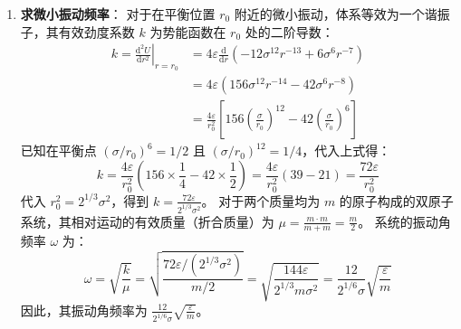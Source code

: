 \begin{solution}
\begin{enumerate}
    \item[(b)] \textbf{求微小振动频率}：
    对于在平衡位置 $r_0$ 附近的微小振动，体系等效为一个谐振子，其有效劲度系数 $k$ 为势能函数在 $r_0$ 处的二阶导数：
    \begin{align*}
        k = \left. \frac{\mathrm{d}^2 U}{\mathrm{d}r^2} \right|_{r=r_0} &= 4\varepsilon \frac{\mathrm{d}}{\mathrm{d}r} \left( -12 \sigma^{12} r^{-13} + 6 \sigma^6 r^{-7} \right) \\
          &= 4\varepsilon \left( 156 \sigma^{12} r^{-14} - 42 \sigma^6 r^{-8} \right) \\
          &= \frac{4\varepsilon}{r_0^2} \left[ 156 \left(\frac{\sigma}{r_0}\right)^{12} - 42 \left(\frac{\sigma}{r_0}\right)^6 \right]
    \end{align*}
    已知在平衡点 $(\sigma/r_0)^6 = 1/2$ 且 $(\sigma/r_0)^{12} = 1/4$，代入上式得：
    $$ k = \frac{4\varepsilon}{r_0^2} \left( 156 \times \frac{1}{4} - 42 \times \frac{1}{2} \right) = \frac{4\varepsilon}{r_0^2} (39 - 21) = \frac{72\varepsilon}{r_0^2} $$
    代入 $r_0^2 = 2^{1/3} \sigma^2$，得到 $k = \frac{72\varepsilon}{2^{1/3} \sigma^2}$。
    对于两个质量均为 $m$ 的原子构成的双原子系统，其相对运动的有效质量（折合质量）为 $\mu = \frac{m \cdot m}{m + m} = \frac{m}{2}$。
    系统的振动角频率 $\omega$ 为：
    $$ \omega = \sqrt{\frac{k}{\mu}} = \sqrt{ \frac{72\varepsilon / (2^{1/3} \sigma^2)}{m/2} } = \sqrt{ \frac{144\varepsilon}{2^{1/3} m \sigma^2} } = \frac{12}{2^{1/6} \sigma} \sqrt{\frac{\varepsilon}{m}} $$
    因此，其振动角频率为 $\frac{12}{2^{1/6} \sigma} \sqrt{\frac{\varepsilon}{m}}$。
\end{enumerate}
\end{solution}

